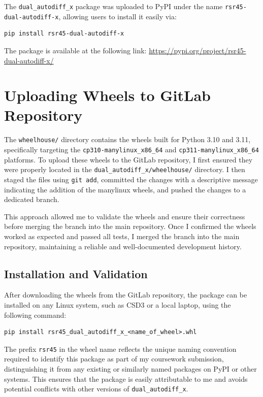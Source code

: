 \documentclass[a4paper,12pt]{article}
\begin{document}
The \texttt{dual\_autodiff\_x} package was uploaded to PyPI under the name \texttt{rsr45-dual-autodiff-x}, allowing users to install it easily via:
\begin{verbatim}
pip install rsr45-dual-autodiff-x
\end{verbatim}

The package is available at the following link: \href{https://pypi.org/project/rsr45-dual-autodiff-x/}{https://pypi.org/project/rsr45-dual-autodiff-x/}


\section{Uploading Wheels to GitLab Repository}

The \texttt{wheelhouse/} directory contains the wheels built for Python 3.10 and 3.11, specifically targeting the \texttt{cp310-manylinux\_x86\_64} and \texttt{cp311-manylinux\_x86\_64} platforms. To upload these wheels to the GitLab repository, I first ensured they were properly located in the \texttt{dual\_autodiff\_x/wheelhouse/} directory. I then staged the files using \texttt{git add}, committed the changes with a descriptive message indicating the addition of the manylinux wheels, and pushed the changes to a dedicated branch. 

This approach allowed me to validate the wheels and ensure their correctness before merging the branch into the main repository. Once I confirmed the wheels worked as expected and passed all tests, I merged the branch into the main repository, maintaining a reliable and well-documented development history.


\subsection{Installation and Validation}
After downloading the wheels from the GitLab repository, the package can be installed on any Linux system, such as CSD3 or a local laptop, using the following command:
\begin{verbatim}
pip install rsr45_dual_autodiff_x_<name_of_wheel>.whl
\end{verbatim}

The prefix \texttt{rsr45} in the wheel name reflects the unique naming convention required to identify this package as part of my coursework submission, distinguishing it from any existing or similarly named packages on PyPI or other systems. This ensures that the package is easily attributable to me and avoids potential conflicts with other versions of \texttt{dual\_autodiff\_x}.
\end{document}

